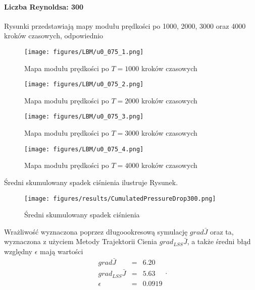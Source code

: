 \documentclass[12pt]{article}
\begin{document}
\paragraph{Liczba Reynoldsa: 300}
Rysunki przedstawiają mapy modułu prędkości po 1000, 2000, 3000 oraz 4000 kroków czasowych, odpowiednio 
\begin{figure}[H]
	\texttt{[image: figures/LBM/u0\_075\_1.png]} 
	\caption{Mapa modułu prędkości po $ T=1000 $ kroków czasowych}
\end{figure}
\begin{figure}[H]
	\texttt{[image: figures/LBM/u0\_075\_2.png]} 
	\caption{Mapa modułu prędkości po $ T=2000 $ kroków czasowych}
\end{figure}
\begin{figure}[H]
	\texttt{[image: figures/LBM/u0\_075\_3.png]} 
	\caption{Mapa modułu prędkości po $ T=3000 $ kroków czasowych}
\end{figure}
\begin{figure}[H]
	\texttt{[image: figures/LBM/u0\_075\_4.png]} 
	\caption{Mapa modułu prędkości po $ T=4000 $ kroków czasowych}
\end{figure}
Średni skumulowany spadek ciśnienia ilustruje Rysunek.
\begin{figure}[H]
	\texttt{[image: figures/results/CumulatedPressureDrop300.png]} 
	\centering
	\caption{Średni skumulowany spadek ciśnienia}
\end{figure}
Wrażliwość wyznaczona poprzez długoookresową symulację $ grad\bar{J} $ oraz ta, wyznaczona z użyciem Metody Trajektorii Cienia $ grad_{LSS}\bar{J} $, a także średni błąd względny $ \epsilon $ mają wartości
\begin{equation}
\begin{array}{rcl}
grad\bar{J} &=& 6.20\\
grad_{LSS}\bar{J} &=& 5.63 \\
\epsilon &=& 0.0919
\end{array} .
\label{results300}
\end{equation}
\end{document}

